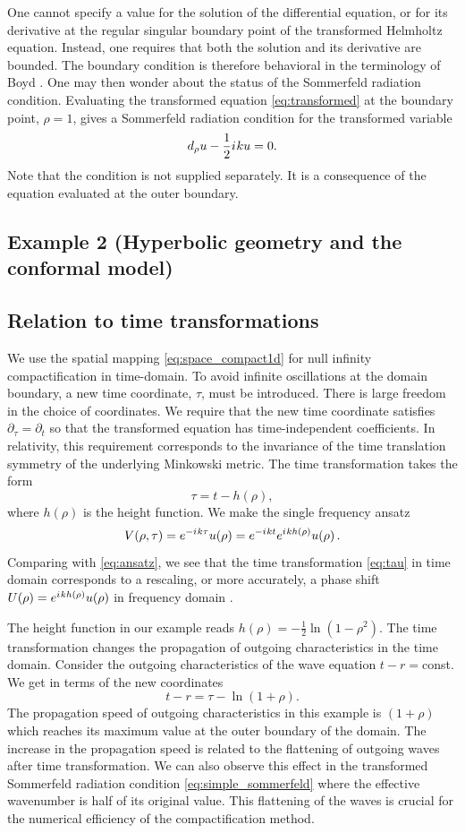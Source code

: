 \documentclass[final,onefignum,onetabnum]{siamart190516}
\newcommand{\be}{\begin{equation}}
\newcommand{\ee}{\end{equation}}
\newcommand{\iu}{{i\mkern1mu}}
\begin{document}
One cannot specify a value for the solution of the differential equation, or for its derivative at the regular singular boundary point of the transformed Helmholtz equation. Instead, one requires that both the solution and its derivative are bounded. The boundary condition is therefore behavioral in the terminology of Boyd \cite{boyd2001chebyshev}. One may then wonder about the status of the Sommerfeld radiation condition. Evaluating the transformed equation \eqref{eq:transformed} at the boundary point, $\rho=1$, gives a Sommerfeld radiation condition for the transformed variable
\be\label{eq:simple_sommerfeld} d_\rho u - \frac{1}{2} \iu k u = 0. \ee
Note that the condition is not supplied separately. It is a consequence of the equation evaluated at the outer boundary.

\subsection{Example 2 (Hyperbolic geometry and the conformal model)}

\subsection{Relation to time transformations}\label{sec:time}

We use the spatial mapping \eqref{eq:space_compact1d} for null infinity compactification in time-domain. To avoid infinite oscillations at the domain boundary, a new time coordinate, $\tau$, must be introduced. There is large freedom in the choice of coordinates. We require that the new time coordinate satisfies $\partial_\tau=\partial_t$ so that the transformed equation has time-independent coefficients. In relativity, this requirement corresponds to the invariance of the time translation symmetry of the underlying Minkowski metric. The time transformation takes the form
\be\label{eq:tau} \tau = t - h(\rho),\ee
where $h(\rho)$ is the height function. We make the single frequency ansatz
\[ V(\rho, \tau) = e^{-\iu k \tau} u(\rho) = e^{-\iu k t} e^{\iu k h(\rho)} u(\rho)\,.\]
Comparing with \eqref{eq:ansatz}, we see that the time transformation \eqref{eq:tau} in time domain corresponds to a rescaling, or more accurately, a phase shift $U(\rho) = e^{\iu k h(\rho)} u(\rho)$ in frequency domain \cite{ZengFramework, marchner2021stable}.

The height function in our example reads $h(\rho)=-\tfrac{1}{2}\ln(1-\rho^2)$. The time transformation changes the propagation of outgoing characteristics in the time domain. Consider the outgoing characteristics of the wave equation $t-r=$const. We get in terms of the new coordinates
\be\label{eq:time_chars} t - r = \tau - \ln(1+\rho).\ee
The propagation speed of outgoing characteristics in this example is $(1+\rho)$ which reaches its maximum value at the outer boundary of the domain. The increase in the propagation speed is related to the flattening of outgoing waves after time transformation. We can also observe this effect in the transformed Sommerfeld radiation condition \eqref{eq:simple_sommerfeld} where the effective wavenumber is half of its original value. This flattening of the waves is crucial for the numerical efficiency of the compactification method.
\end{document}
